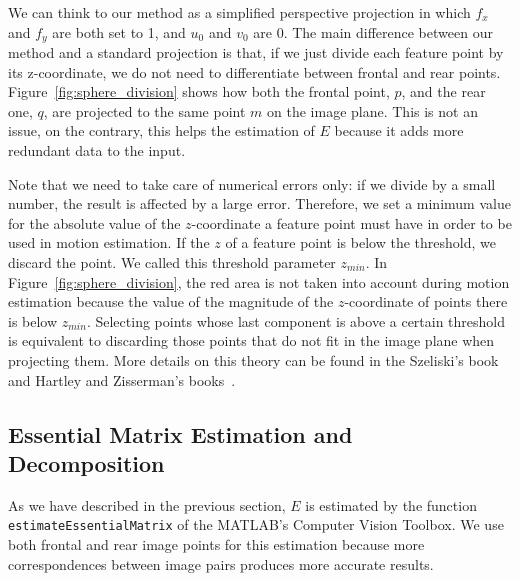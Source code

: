 We can think to our method as a simplified perspective projection in which
$f_x$ and $f_y$ are both set to 1, and $u_0$ and $v_0$ are 0.
The main difference between our method and a standard projection is that, if we
just divide each feature point by its z-coordinate, we do not need to 
differentiate between frontal and rear points.
Figure~\ref{fig:sphere_division} shows how both the frontal point, $p$, and the 
rear one, $q$, are projected to the same point $m$ on the image plane.
This is not an issue, on the contrary, this helps the estimation of $E$ because 
it adds more redundant data to the input.

Note that we need to take care of numerical errors only: if we divide by a 
small number, the result is affected by a large error. Therefore, we
set a minimum value for the absolute value of the $z$-coordinate a feature point must 
have in order to be used in motion estimation. If the $z$ of a
feature point is below the threshold, we discard the point.
%
We called this threshold parameter $z_{min}$.
In Figure~\ref{fig:sphere_division}, the red area is not taken into account 
during motion estimation because the value of the magnitude of the 
$z$-coordinate of points there 
is below $z_{min}$.
%
Selecting points whose last component is above a certain threshold is 
equivalent to discarding those points that do not fit in the image plane
when projecting them. More details on this theory can be found in the
Szeliski's book~\cite{szeliski2010computer} and Hartley and Zisserman's
books~\cite{Hartley2004}.

\subsection{Essential Matrix Estimation and Decomposition}\label{subsec:essential_estimation}
As we have described in the previous section, $E$ is estimated 
by the function {\tt estimateEssentialMatrix} of the MATLAB's 
Computer Vision Toolbox.
We use both frontal and rear image points for this estimation because
more correspondences between image pairs produces more accurate results.

